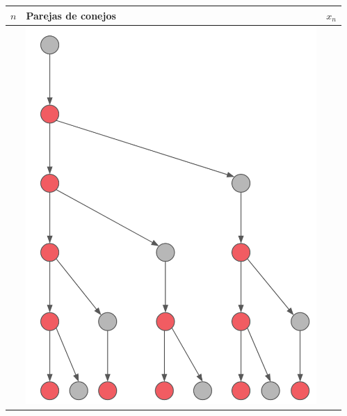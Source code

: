 {\begin{frame}
		\begin{columns}[t]
			\hspace{-3mm}
			\begin{column}{0.4\textwidth}	
				\vspace{-10mm}
				\centering
				\begin{table}[H]
					\centering
					\begin{tabular}{| c | m{3cm} | c |}
						\hline
						$n$ & Parejas de conejos & $x_n$ \\
						\hline
						&  \vspace{1mm} \includegraphics[scale=0.18]{imagenes/fibonacci} &  \\
						\hline
					\end{tabular}
				\end{table}
			\end{column}
			\hspace{-0mm}
			\begin{column}{0.5\textwidth}
				\vspace{-2mm}

\end{column}
\end{columns}
\end{frame}}
